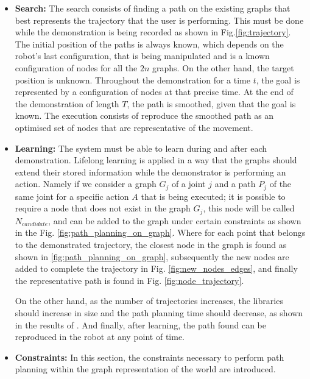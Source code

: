 \documentclass[thesis]{mas_proposal}
\begin{document}
	\begin{itemize}    
			 
		\item \textbf{Search:}
		The search consists of finding a path on the existing graphs that best represents the trajectory that the user is performing. This must be done while the demonstration is being recorded as shown in Fig.\ref{fig:trajectory}. The initial position of the paths is always known, which depends on the robot's last configuration, that is being manipulated and is a known configuration of nodes for all the $2n$ graphs. On the other hand, the target position is unknown. Throughout the demonstration for a time $t$, the goal is represented by a configuration of nodes at that precise time. At the end of the demonstration of length $T$, the path is smoothed, given that the goal is known. The execution consists of reproduce the smoothed path as an optimised set of nodes that are representative of the movement.
		
		\item \textbf{Learning:}
		The system must be able to learn during and after each demonstration. Lifelong learning is applied in a way that the graphs should extend their stored information while the demonstrator is performing an action. Namely if we consider a graph $G_j$ of a joint $j$ and a path $P_j$ of the same joint for a specific action $A$ that is being executed; it is possible to require a node that does not exist in the graph $G_j$, this node will be called $N_{candidate}$, and can be added to the graph under certain constraints as shown in the Fig. \ref{fig:path_planning_on_graph}. Where for each point that belongs to the demonstrated trajectory, the closest node in the graph is found as shown in \ref{fig:path_planning_on_graph}, subsequently the new nodes are added to complete the trajectory in Fig. \ref{fig:new_nodes_edges}, and finally the representative path is found in Fig. \ref{fig:node_trajectory}.
		
		On the other hand, as the number of trajectories increases, the libraries should increase in size and the path planning time should decrease, as shown in the results of \cite{Berenson2012, Coleman2015}. And finally, after learning, the path found can be reproduced in the robot at any point of time. 
		 
		\item \textbf{Constraints:}
		 In this section, the constraints necessary to perform path planning within the graph representation of the world are introduced.
		 

\end{itemize}
\end{document}
